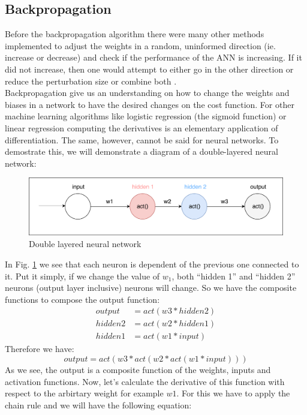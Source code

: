 \subsection{Backpropagation}
Before the backpropagation algorithm there were many other methods implemented to adjust the weights in a random, uninformed direction (ie. increase or decrease) and check if the performance of the ANN is increasing. If it did not increase, then one would attempt to either go in the other direction or reduce the perturbation size or combine both \cite{ayearofai}.\\
Backpropagation give us an understanding on how to change the weights and biases in a network to have the desired changes on the cost function. For other machine learning algorithms like logistic regression (the sigmoid function) or linear regression computing the derivatives is an elementary application of differentiation. The same, however, cannot be said for neural networks. To demostrate this, we will demonstrate a diagram of a double-layered neural network:
\begin{figure}[h!]
\includegraphics[width=15cm,center,keepaspectratio]{figures/double_layered_neural_network}
\caption{Double layered neural network}
\label{fig:double_layered_neural_network}
\end{figure}
In Fig. \ref{fig:double_layered_neural_network} we see that each neuron is dependent of the previous one connected to it. Put it simply, if we change the value of $w_1$, both ``hidden 1'' and ``hidden 2'' neurons (output layer inclusive) neurons will change. So we have the composite functions to compose the output function:
\begin{align*}
output &= act(w3 * hidden2)\\
hidden2 &= act(w2 * hidden1) \\
hidden1 &= act(w1 * input)
\end{align*}
Therefore we have:
\begin{equation}
output = act(w3 * act(w2*act(w1*input)))
\end{equation}
As we see, the output is a composite function of the weights, inputs and activation functions. Now, let's calculate the derivative  of this function with respect to the arbirtary weight for example $w1$. For this we have to apply the chain rule and we will have the following equation:
